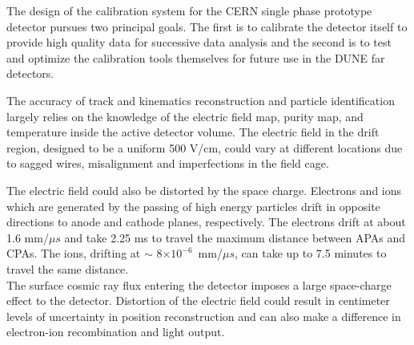 \label{calibration}
The design of the calibration system for the CERN single phase prototype detector pursues two principal goals. The first is to calibrate the detector itself to
provide high quality data for successive data analysis and the second is to test and optimize the calibration tools themselves for future
use in the DUNE far detectors.

The accuracy of track and kinematics reconstruction and particle identification largely relies on the knowledge of the electric field map, purity map, and temperature inside the active detector volume. The electric field in the drift region, designed to be a uniform 500 V/cm, could vary at different locations due to sagged wires, misalignment and imperfections in the field cage. 


The electric field could also be distorted by the space charge.  Electrons and ions which are generated by the passing of high energy particles drift in opposite directions to anode and cathode planes, respectively. The electrons drift at about 1.6 mm/$\mu s$ and take 2.25 ms to travel the maximum distance between APAs and CPAs. The ions, drifting at $\sim$ 8$\times 10^{-6}$~mm/$\mu s$, can take up to 7.5 minutes to travel the same distance. \\
The surface cosmic ray flux entering the detector imposes a large space-charge effect to the detector. 
Distortion of the electric field could result in centimeter levels of uncertainty in position reconstruction and can also make a difference in electron-ion recombination and light output. 

